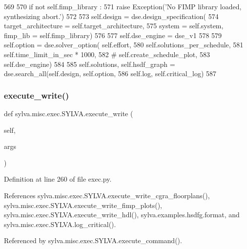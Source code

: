 \begin{DoxyCode}
569 
570       \textcolor{keywordflow}{if} \textcolor{keywordflow}{not} self.fimp\_library :
571         \textcolor{keywordflow}{raise} Exception(\textcolor{stringliteral}{'No FIMP library loaded, synthesizing abort.'})
572 
573       self.design = dse.design\_specification(
574         target\_architecture = self.target\_architecture,
575         system = self.system, fimp\_lib = self.fimp\_library)
576 
577     self.dse\_engine = dse\_v1
578 
579     self.option = dse.solver\_option( self.effort,
580                               self.solutions\_per\_schedule,
581                               self.time\_limit\_in\_sec * 1000,
582                               \textcolor{comment}{# self.create\_schedule\_plot,}
583                               self.dse\_engine)
584 
585     self.solutions, self.hsdf\_graph = dse.search\_all(self.design, self.option,
586       self.log, self.critical\_log)
587 
\end{DoxyCode}
\mbox{\label{classsylva_1_1misc_1_1exec_1_1_s_y_l_v_a_a395e3cd0c375c051762dd035dbbfe9b4}} 
\subsubsection{\texorpdfstring{execute\+\_\+write()}{execute\_write()}}
{\footnotesize\ttfamily def sylva.\+misc.\+exec.\+S\+Y\+L\+V\+A.\+execute\+\_\+write (\begin{DoxyParamCaption}\item[{}]{self,  }\item[{}]{args }\end{DoxyParamCaption})}



Definition at line 260 of file exec.\+py.



References sylva.\+misc.\+exec.\+S\+Y\+L\+V\+A.\+execute\+\_\+write\+\_\+cgra\+\_\+floorplans(), sylva.\+misc.\+exec.\+S\+Y\+L\+V\+A.\+execute\+\_\+write\+\_\+fimp\+\_\+plots(), sylva.\+misc.\+exec.\+S\+Y\+L\+V\+A.\+execute\+\_\+write\+\_\+hdl(), sylva.\+examples.\+hsdfg.\+format, and sylva.\+misc.\+exec.\+S\+Y\+L\+V\+A.\+log\+\_\+critical().



Referenced by sylva.\+misc.\+exec.\+S\+Y\+L\+V\+A.\+execute\+\_\+command().


